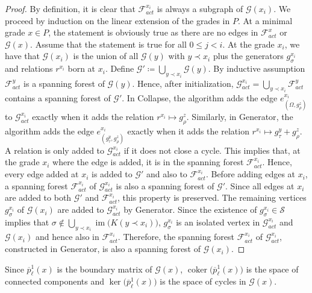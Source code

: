 \documentclass[english,a4paper,nolineno,cleveref]{socg-lipics-v2021}
\DeclareMathOperator{\im}{im}
\DeclareMathOperator{\coker}{coker}
\begin{document}
\begin{proof}
By definition, it is clear that $\mathcal{F}_{act}^{x_i}$ is always a subgraph of $\mathcal{G}(x_i)$. We proceed by induction on the linear extension of the grades in $P$. At a minimal grade $x\in P$, the statement is obviously true as there are no edges in $\mathcal{F}_{act}^{x}$ or $\mathcal{G}(x)$. Assume that the statement is true for all $0\leq j<i$. At the grade $x_i$, we have that $\mathcal{G}(x_i)$ is the union of all $\mathcal{G}(y)$ with $y\prec x_i$ plus the generators $g^{x_i}_\sigma$ and relations $r^{x_i}$ born at $x_i$. Define $\mathcal{G}'\coloneqq\bigcup_{y\prec x_i}\mathcal{G}(y)$. By inductive assumption $\mathcal{F}_{act}^y$ is a spanning forest of $\mathcal{G}(y)$. Hence, after initialization, $\mathcal{G}_{act}^{x_i}=\bigcup_{y\prec x_i}\mathcal{F}_{act}^y$ contains a spanning forest of $\mathcal{G}'$. In {\sc Collapse}, the algorithm adds the edge $e^{x_i}_{(\Omega,g^z_\rho)}$ to $\mathcal{G}_{act}^{x_i}$ exactly when it adds the relation $r^{x_i}\mapsto g^z_\rho$. Similarly, in {\sc Generator}, the algorithm adds the edge $e^{x_i}_{(g^y_\tau,g^z_\rho)}$ exactly when it adds the relation $r^{x_i}\mapsto g^y_\tau+g^z_\rho$. A relation is only added to $\mathcal{G}_{act}^{x_i}$ if it does not close a cycle. This implies that, at the grade $x_i$ where the edge is added, it is in the spanning forest $\mathcal{F}_{act}^{x_i}$. Hence, every edge added at $x_i$ is added to $\mathcal{G}'$ and also to $\mathcal{F}_{act}^{x_i}$. Before adding edges at $x_i$, a spanning forest $\mathcal{F}_{act}^{x_i}$ of $\mathcal{G}_{act}^{x_i}$ is also a spanning forest of $\mathcal{G'}$. Since all edges at $x_i$ are added to both $\mathcal{G}'$ and $\mathcal{F}_{act}^{x_i}$, this property is preserved. The remaining vertices $g_\sigma^{x_i}$ of $\mathcal{G}(x_i)$ are added to $\mathcal{G}_{act}^{x_i}$ by {\sc Generator}. Since the existence of $g_\sigma^{x_i}\in\mathcal{S}$ implies that $\sigma\notin\bigcup_{y\prec x_i}\im \!\big(K(y\prec x_i)\big)$, $g_\sigma^{x_i}$ is an isolated vertex in $\mathcal{G}_{act}^{x_i}$ and $\mathcal{G}(x_i)$ and hence also in $\mathcal{F}_{act}^{x_i}$.  Therefore, the spanning forest $\mathcal{F}_{act}^{x_i}$ of $\mathcal{G}_{act}^{x_i}$, constructed in {\sc Generator}, is also a spanning forest of $\mathcal{G}(x_i)$.  
\end{proof}

\begin{remark}
Since $\overline{p}^1_\ell(x)$ is the boundary matrix of $\mathcal{G}(x)$, $\coker\!\big(\overline{p}^1_\ell(x)\big)$ is the space of connected components and $\ker\!\big(\overline{p}^1_\ell(x)\big)$ is the space of cycles in $\mathcal{G}(x)$.
\end{remark}
\end{document}
